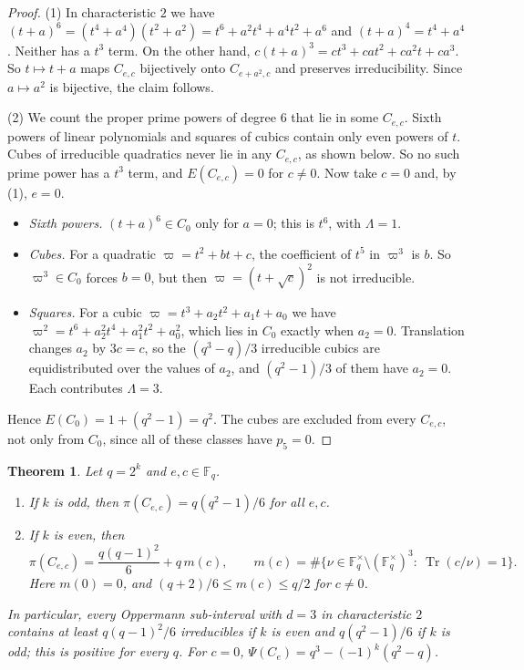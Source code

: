 \documentclass[11pt,a4paper]{amsart}
\newtheorem{theorem}{Theorem}[section]
\theoremstyle{definition}
\theoremstyle{remark}
\newcommand{\F}{\mathbb{F}}
\newcommand{\Tr}{\operatorname{Tr}}
\begin{document}
\begin{proof}
(1) In characteristic $2$ we have $(t+a)^6=(t^4+a^4)(t^2+a^2)=t^6+a^2t^4+a^4t^2+a^6$ and $(t+a)^4=t^4+a^4$. Neither has a
$t^3$ term. On the other hand, $c(t+a)^3=ct^3+cat^2+ca^2t+ca^3$. So $t\mapsto t+a$ maps $C_{e,c}$ bijectively onto
$C_{e+a^2,c}$ and preserves irreducibility. Since $a\mapsto a^2$ is bijective, the claim follows.

(2) We count the proper prime powers of degree $6$ that lie in some $C_{e,c}$. Sixth powers of linear polynomials and
squares of cubics contain only even powers of $t$. Cubes of irreducible quadratics never lie in any $C_{e,c}$, as shown
below. So no such prime power has a $t^3$ term, and $E(C_{e,c})=0$ for $c\ne0$. Now take $c=0$ and, by (1), $e=0$.
\begin{itemize}
\item \emph{Sixth powers.} $(t+a)^6\in C_0$ only for $a=0$; this is $t^6$, with $\Lambda=1$.
\item \emph{Cubes.} For a quadratic $\varpi=t^2+bt+c$, the coefficient of $t^5$ in $\varpi^3$ is $b$. So $\varpi^3\in C_0$
forces $b=0$, but then $\varpi=(t+\sqrt c)^2$ is not irreducible.
\item \emph{Squares.} For a cubic $\varpi=t^3+a_2t^2+a_1t+a_0$ we have $\varpi^2=t^6+a_2^2t^4+a_1^2t^2+a_0^2$, which lies
in $C_0$ exactly when $a_2=0$. Translation changes $a_2$ by $3c=c$, so the $(q^3-q)/3$ irreducible cubics are
equidistributed over the values of $a_2$, and $(q^2-1)/3$ of them have $a_2=0$. Each contributes $\Lambda=3$.
\end{itemize}
Hence $E(C_0)=1+(q^2-1)=q^2$. The cubes are excluded from every $C_{e,c}$, not only from $C_0$, since all of these
classes have $p_5=0$.
\end{proof}

\begin{theorem}\label{thm:p3zero}
Let $q=2^k$ and $e,c\in\F_q$.
\begin{enumerate}
\item If $k$ is odd, then $\pi(C_{e,c})=q(q^2-1)/6$ for all $e,c$.
\item If $k$ is even, then
\[
\pi(C_{e,c})=\frac{q(q-1)^2}{6}+q\,m(c),\qquad
m(c)=\#\{\nu\in\F_q^\times\setminus(\F_q^\times)^3:\ \Tr(c/\nu)=1\}.
\]
Here $m(0)=0$, and $(q+2)/6\le m(c)\le q/2$ for $c\ne0$.
\end{enumerate}
In particular, every Oppermann sub-interval with $d=3$ in characteristic $2$ contains at least $q(q-1)^2/6$
irreducibles if $k$ is even and $q(q^2-1)/6$ if $k$ is odd; this is positive for every $q$. For $c=0$,
$\Psi(C_e)=q^3-(-1)^k(q^2-q)$.
\end{theorem}
\end{document}
